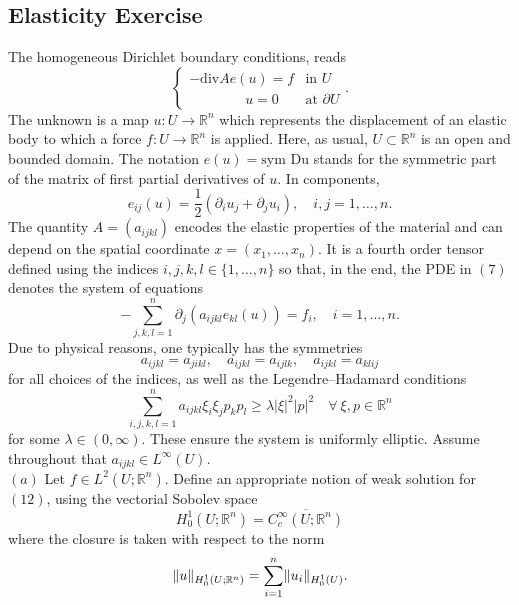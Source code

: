 \documentclass{article}
\DeclarePairedDelimiter{\norm}{\lVert}{\rVert}
\begin{document}
\begin{flushleft}
\subsection{\textbf{Elasticity Exercise}} The homogeneous Dirichlet boundary conditions, reads
\[\begin{equation}
  \begin{cases} 
      -\text{div}Ae(u)=f & \text{in $U$} \\
      \qquad\qquad u=0 & \text{at $\partial U$} 
   \end{cases}.
   \end{equation}
\]
The unknown is a map $u:U\to\mathbb R^n$ which represents the displacement of an elastic body to which a force $f:U\to\mathbb R^n$ is applied. Here, as usual, $U\subset\mathbb R^n$ is an open and bounded domain. The notation $e(u) = \text{sym Du}$ stands for the symmetric part of the matrix of first partial derivatives of $u$. In components,
$$e_{ij}(u)=\frac{1}{2}(\partial_i u_j + \partial_j u_i),\quad i,j=1,\ldots,n.$$
The quantity $A= (a_{ijkl})$ encodes the elastic properties of the material and can depend on the spatial coordinate $x=(x_1,\ldots,x_n).$ It is a fourth order tensor defined using the indices $i,j,k,l\in\{1,\ldots,n\}$ so that, in the end, the PDE in $(7)$ denotes the system of equations
$$-\sum_{j,k,l=1}^n \partial_j(a_{ijkl}e_{kl}(u))=f_i,\quad i=1,\ldots,n.$$
Due to physical reasons, one typically has the symmetries
$$a_{ijkl}=a_{jikl},\quad a_{ijkl}=a_{ijlk},\quad a_{ijkl}=a_{klij}$$
for all choices of the indices, as well as the Legendre–Hadamard conditions
$$\sum_{i,j,k,l=1}^n a_{ijkl} \xi_i \xi_j p_k p_l \ge \lambda |\xi|^2 |p|^2 \quad \forall ~\xi,p\in\mathbb R^n$$
for some $\lambda \in(0,\infty).$ These ensure the system is uniformly elliptic. Assume throughout that $a_{ijkl}\in L^{\infty}(U)$.
\bigskip
\\
$(a)$ Let $f\in L^2(U;\mathbb R^n)$. Define an appropriate notion of weak solution for $(12)$, using the vectorial Sobolev space
$$H_0^1(U;\mathbb R^n)=\overline{C_c^{\infty}(U;\mathbb R^n)}$$
where the closure is taken with respect to the norm
$$\norm{u}_{H_0^1(U;\mathbb R^n)}=\sum_{i=1}^n \norm{u_i}_{H_0^1(U)}.$$


\end{flushleft}
\end{document}
